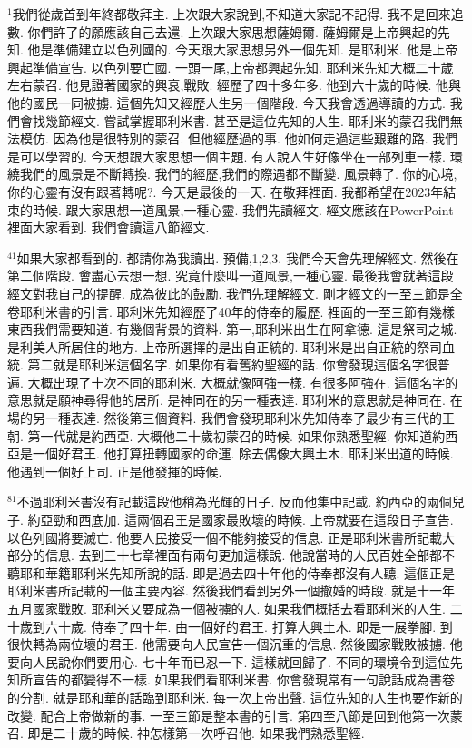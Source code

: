\documentclass{book}
\begin{document}
$^{1}$我們從歲首到年終都敬拜主.
上次跟大家說到,不知道大家記不記得.
我不是回來追數.
你們許了的願應該自己去還.
上次跟大家思想薩姆爾.
薩姆爾是上帝興起的先知.
他是準備建立以色列國的.
今天跟大家思想另外一個先知.
是耶利米.
他是上帝興起準備宣告.
以色列要亡國.
一頭一尾,上帝都興起先知.
耶利米先知大概二十歲左右蒙召.
他見證著國家的興衰,戰敗.
經歷了四十多年多.
他到六十歲的時候.
他與他的國民一同被擄.
這個先知又經歷人生另一個階段.
今天我會透過導讀的方式.
我們會找幾節經文.
嘗試掌握耶利米書.
甚至是這位先知的人生.
耶利米的蒙召我們無法模仿.
因為他是很特別的蒙召.
但他經歷過的事.
他如何走過這些艱難的路.
我們是可以學習的.
今天想跟大家思想一個主題.
有人說人生好像坐在一部列車一樣.
環繞我們的風景是不斷轉換.
我們的經歷,我們的際遇都不斷變.
風景轉了.
你的心境,你的心靈有沒有跟著轉呢?.
今天是最後的一天.
在敬拜裡面.
我都希望在2023年結束的時候.
跟大家思想一道風景,一種心靈.
我們先讀經文.
經文應該在PowerPoint裡面大家看到.
我們會讀這八節經文.

$^{41}$如果大家都看到的.
都請你為我讀出.
預備,1,2,3.
我們今天會先理解經文.
然後在第二個階段.
會盡心去想一想.
究竟什麼叫一道風景,一種心靈.
最後我會就著這段經文對我自己的提醒.
成為彼此的鼓勵.
我們先理解經文.
剛才經文的一至三節是全卷耶利米書的引言.
耶利米先知經歷了40年的侍奉的履歷.
裡面的一至三節有幾樣東西我們需要知道.
有幾個背景的資料.
第一,耶利米出生在阿拿德.
這是祭司之城.
是利美人所居住的地方.
上帝所選擇的是出自正統的.
耶利米是出自正統的祭司血統.
第二就是耶利米這個名字.
如果你有看舊約聖經的話.
你會發現這個名字很普遍.
大概出現了十次不同的耶利米.
大概就像阿強一樣.
有很多阿強在.
這個名字的意思就是願神尋得他的居所.
是神同在的另一種表達.
耶利米的意思就是神同在.
在場的另一種表達.
然後第三個資料.
我們會發現耶利米先知侍奉了最少有三代的王朝.
第一代就是約西亞.
大概他二十歲初蒙召的時候.
如果你熟悉聖經.
你知道約西亞是一個好君王.
他打算扭轉國家的命運.
除去偶像大興土木.
耶利米出道的時候.
他遇到一個好上司.
正是他發揮的時候.

$^{81}$不過耶利米書沒有記載這段他稍為光輝的日子.
反而他集中記載.
約西亞的兩個兒子.
約亞勁和西底加.
這兩個君王是國家最敗壞的時候.
上帝就要在這段日子宣告.
以色列國將要滅亡.
他要人民接受一個不能夠接受的信息.
正是耶利米書所記載大部分的信息.
去到三十七章裡面有兩句更加這樣說.
他說當時的人民百姓全部都不聽耶和華籍耶利米先知所說的話.
即是過去四十年他的侍奉都沒有人聽.
這個正是耶利米書所記載的一個主要內容.
然後我們看到另外一個撤婚的時段.
就是十一年五月國家戰敗.
耶利米又要成為一個被擄的人.
如果我們概括去看耶利米的人生.
二十歲到六十歲.
侍奉了四十年.
由一個好的君王.
打算大興土木.
即是一展拳腳.
到很快轉為兩位壞的君王.
他需要向人民宣告一個沉重的信息.
然後國家戰敗被擄.
他要向人民說你們要用心.
七十年而已忍一下.
這樣就回歸了.
不同的環境令到這位先知所宣告的都變得不一樣.
如果我們看耶利米書.
你會發現常有一句說話成為書卷的分割.
就是耶和華的話臨到耶利米.
每一次上帝出聲.
這位先知的人生也要作新的改變.
配合上帝做新的事.
一至三節是整本書的引言.
第四至八節是回到他第一次蒙召.
即是二十歲的時候.
神怎樣第一次呼召他.
如果我們熟悉聖經.
\end{document}
